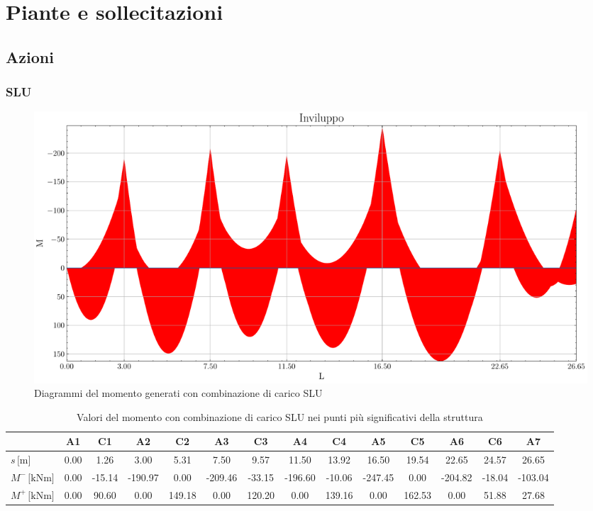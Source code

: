 \chapter{Piante e sollecitazioni}

\section{Azioni}
\clearpage	
\begin{landscape}
\subsection{SLU}
\begin{figure}[H]
\centering
\includegraphics[height=0.6\textwidth]{IMG/diagrammi_trave/m.pdf}
\caption{Diagrammi del momento generati con combinazione di carico SLU}
\label{fig:trave_ULS_momento}
\end{figure}
\begin{table}[H]
\footnotesize
\centering
\caption{Valori del momento con combinazione di carico SLU nei punti più significativi della struttura}
\label{tab:trave_ULS_momento}
	\begin{tabular}{lS[table-format=-3.2]S[table-format=-3.2]S[table-format=-3.2]S[table-format=-3.2]S[table-format=-3.2]S[table-format=-3.2]S[table-format=-3.2]S[table-format=-3.2]S[table-format=-3.2]S[table-format=-3.2]S[table-format=-3.2]S[table-format=-3.2]S[table-format=-3.2]}
		\toprule
		{} & {A1} & {C1} & {A2} & {C2} & {A3} & {C3} & {A4} & {C4} & {A5} & {C5} & {A6} & {C6} & {A7} \\
		\midrule
		$s\,\si{[\metre]}$ & 0.00 & 1.26 & 3.00 & 5.31 & 7.50 & 9.57 & 11.50 & 13.92 & 16.50 & 19.54 & 22.65 & 24.57 & 26.65 \\
        $M^{-}\,\si{[\kilo\newton\metre]}$ & 0.00 & -15.14 & -190.97 & 0.00 & -209.46 & -33.15 & -196.60 & -10.06 & -247.45 & 0.00 & -204.82 & -18.04 & -103.04 \\
        $M^{+}\,\si{[\kilo\newton\metre]}$ & 0.00 & 90.60 & 0.00 & 149.18 & 0.00 & 120.20 & 0.00 & 139.16 & 0.00 & 162.53 & 0.00 & 51.88 & 27.68 \\
		\bottomrule
	\end{tabular}
\end{table}
\end{landscape}

